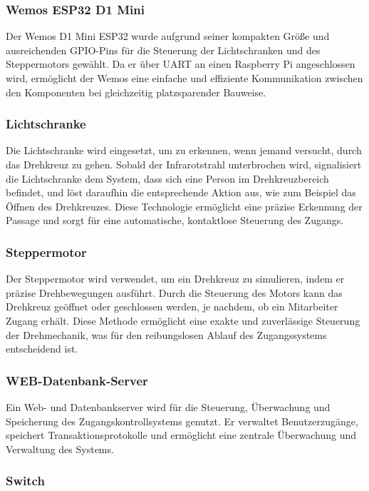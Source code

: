 \subsubsection{Wemos ESP32 D1 Mini}

Der Wemos D1 Mini ESP32 wurde aufgrund seiner kompakten Größe und ausreichenden GPIO-Pins für die Steuerung der Lichtschranken und des Steppermotors gewählt. Da er über UART an einen Raspberry Pi angeschlossen wird, ermöglicht der Wemos eine einfache und effiziente Kommunikation zwischen den Komponenten bei gleichzeitig platzsparender Bauweise.

\subsubsection{Lichtschranke}

Die Lichtschranke wird eingesetzt, um zu erkennen, wenn jemand versucht, durch das Drehkreuz zu gehen. Sobald der Infrarotstrahl unterbrochen wird, signalisiert die Lichtschranke dem System, dass sich eine Person im Drehkreuzbereich befindet, und löst daraufhin die entsprechende Aktion aus, wie zum Beispiel das Öffnen des Drehkreuzes. Diese Technologie ermöglicht eine präzise Erkennung der Passage und sorgt für eine automatische, kontaktlose Steuerung des Zugangs.

\subsubsection{Steppermotor}

Der Steppermotor wird verwendet, um ein Drehkreuz zu simulieren, indem er präzise Drehbewegungen ausführt. Durch die Steuerung des Motors kann das Drehkreuz geöffnet oder geschlossen werden, je nachdem, ob ein Mitarbeiter Zugang erhält. Diese Methode ermöglicht eine exakte und zuverlässige Steuerung der Drehmechanik, was für den reibungslosen Ablauf des Zugangssystems entscheidend ist.

\subsubsection{WEB-Datenbank-Server}

Ein Web- und Datenbankserver wird für die Steuerung, Überwachung und Speicherung des Zugangskontrollsystems genutzt. Er verwaltet Benutzerzugänge, speichert Transaktionsprotokolle und ermöglicht eine zentrale Überwachung und Verwaltung des Systems.

\subsubsection{Switch}

